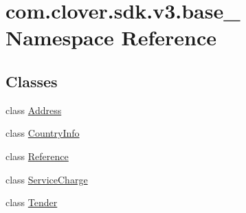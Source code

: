 \hypertarget{namespacecom_1_1clover_1_1sdk_1_1v3_1_1base__}{}\section{com.\+clover.\+sdk.\+v3.\+base\+\_\+ Namespace Reference}
\label{namespacecom_1_1clover_1_1sdk_1_1v3_1_1base__}
\subsection*{Classes}
\begin{DoxyCompactItemize}
\item 
class \hyperlink{classcom_1_1clover_1_1sdk_1_1v3_1_1base___1_1_address}{Address}
\item 
class \hyperlink{classcom_1_1clover_1_1sdk_1_1v3_1_1base___1_1_country_info}{Country\+Info}
\item 
class \hyperlink{classcom_1_1clover_1_1sdk_1_1v3_1_1base___1_1_reference}{Reference}
\item 
class \hyperlink{classcom_1_1clover_1_1sdk_1_1v3_1_1base___1_1_service_charge}{Service\+Charge}
\item 
class \hyperlink{classcom_1_1clover_1_1sdk_1_1v3_1_1base___1_1_tender}{Tender}
\end{DoxyCompactItemize}
